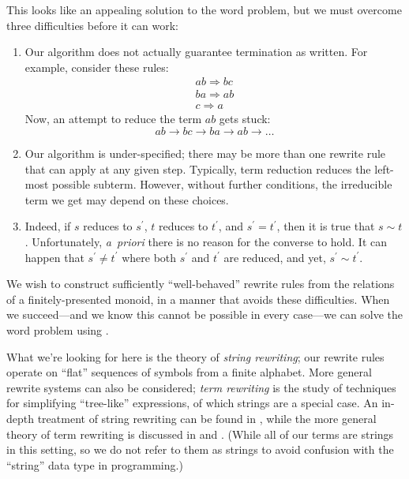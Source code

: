 \documentclass[../generics]{subfiles}
\begin{document}
\begin{quote}
\end{quote}
This looks like an appealing solution to the word problem, but we must overcome three difficulties before it can work:
\begin{enumerate}
\item Our algorithm does not actually guarantee termination as written. For example, consider these rules:
\begin{gather*}
ab\Rightarrow bc\\
ba\Rightarrow ab\\
c\Rightarrow a
\end{gather*}
Now, an attempt to reduce the term $ab$ gets stuck:
\[ab\rightarrow bc\rightarrow ba\rightarrow ab\rightarrow\ldots\]

\item Our algorithm is under-specified; there may be more than one rewrite rule that can apply at any given step. Typically, term reduction reduces the left-most possible subterm. However, without further conditions, the irreducible term we get may depend on these choices.

\item Indeed, if $s$ reduces to $s^\prime$, $t$ reduces to $t^\prime$, and $s^\prime=t^\prime$, then it is true that $s\sim t$. Unfortunately, \emph{a~priori} there is no reason for the converse to hold. It can happen that $s^\prime\neq t^\prime$ where both $s^\prime$ and $t^\prime$ are reduced, and yet, $s^\prime\sim t^\prime$.

\end{enumerate}

We wish to construct sufficiently ``well-behaved'' rewrite rules from the relations of a finitely-presented monoid, in a manner that avoids these difficulties. When we succeed---and we know this cannot be possible in every case---we can solve the word problem using .

What we're looking for here is the theory of \emph{string rewriting}; our rewrite rules operate on ``flat'' sequences of symbols from a finite alphabet. More general rewrite systems can also be considered; \emph{term rewriting} is the study of techniques for simplifying ``tree-like'' expressions, of which strings are a special case. An in-depth treatment of string rewriting can be found in \cite{book2012string}, while the more general theory of term rewriting is discussed in \cite{andallthat} and \cite{formalmans6}. (While all of our terms are strings in this setting, so we do not refer to them as strings to avoid confusion with the ``string'' data type in programming.)
\end{document}
